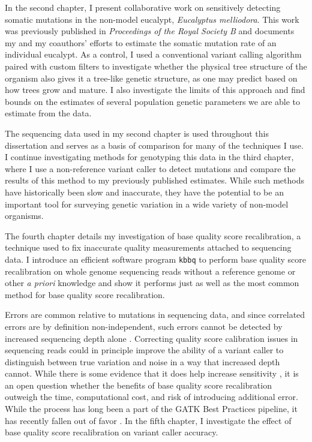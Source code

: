 In the second chapter, I present collaborative work on sensitively detecting somatic mutations in the non-model eucalypt, \textit{Eucalyptus melliodora}. This work was previously published in \textit{Proceedings of the Royal Society B} and documents my and my coauthors' efforts to estimate the somatic mutation rate of an individual eucalypt. As a control, I used a conventional variant calling algorithm paired with custom filters to investigate whether the physical tree structure of the organism also gives it a tree-like genetic structure, as one may predict based on how trees grow and mature. I also investigate the limits of this approach and find bounds on the estimates of several population genetic parameters we are able to estimate from the data.

The sequencing data used in my second chapter is used throughout this dissertation and serves as a basis of comparison for many of the techniques I use.
I continue investigating methods for genotyping this data in the third chapter, where I use a non-reference variant caller to detect mutations and compare the results of this method to my previously published estimates. While such methods have historically been slow and inaccurate, they have the potential to be an important tool for surveying genetic variation in a wide variety of non-model organisms.

The fourth chapter details my investigation of base quality score recalibration, a technique used to fix inaccurate quality measurements attached to sequencing data. I introduce an efficient software program \texttt{kbbq} to perform base quality score recalibration on whole genome sequencing reads without a reference genome or other \textit{a priori} knowledge and show it performs just as well as the most common method for base quality score recalibration.

Errors are common relative to mutations in sequencing data, \parencite{fox_accuracy_2014, wu_estimating_2017} and since correlated errors are by definition non-independent, such errors cannot be detected by increased sequencing depth alone \parencite{meacham_identification_2011, taub_overcoming_2010}. Correcting quality score calibration issues in sequencing reads could in principle improve the ability of a variant caller to distinguish between true variation and noise in a way that increased depth cannot. While there is some evidence that it does help increase sensitivity \parencite{ni_improvement_2016}, it is an open question whether the benefits of base quality score recalibration outweigh the time, computational cost, and risk of introducing additional error. While the process has long been a part of the GATK Best Practices pipeline, it has recently fallen out of favor \parencite{van_der_auwera_geraldine_2020_b}. In the fifth chapter, I investigate the effect of base quality score recalibration on variant caller accuracy.

